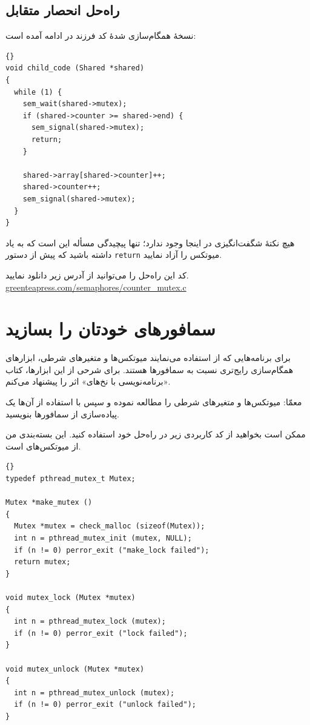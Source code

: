 \documentclass{book}
\newcommand{\clearemptydoublepage}{}%
\begin{document}

\clearemptydoublepage
\subsection{راه‌حل انحصار متقابل}

    نسخهٔ همگام‌سازی شدهٔ کد فرزند در ادامه آمده است:

\begin{latin}
\begin{lstlisting}[title={}]{}
void child_code (Shared *shared)
{
  while (1) {
    sem_wait(shared->mutex);
    if (shared->counter >= shared->end) {
      sem_signal(shared->mutex);
      return;
    }

    shared->array[shared->counter]++;
    shared->counter++;
    sem_signal(shared->mutex);
  }
}
\end{lstlisting}
\end{latin}

    هیچ نکتهٔ شگفت‌انگیزی در اینجا وجود ندارد؛ تنها پیچیدگی مسأله این است که به یاد داشته باشید که پیش از دستور {\tt return} میوتکس را آزاد نمایید.
    

    کد این راه‌حل را می‌توانید از آدرس زیر دانلود نمایید.
\url{greenteapress.com/semaphores/counter_mutex.c}


\clearemptydoublepage
\section{سمافورهای خودتان را بسازید}
\label{makeyourown}

    برای  برنامه‌هایی که از  استفاده می‌نمایند میوتکس‌ها و متغیرهای شرطی، ابزارهای همگام‌سازی رایج‌تری نسبت به سمافورها هستند. 
    برای شرحی از این ابزارها، کتاب «برنامه‌نویسی با نخ‌های» 
    اثر  را پیشنهاد می‌کنم. 

    معمّا: میوتکس‌ها و متغیرهای شرطی را مطالعه نموده و سپس با استفاده از آن‌ها یک پیاده‌سازی از سمافورها بنویسید. 

    ممکن است بخواهید از کد کاربردی زیر در راه‌حل خود استفاده کنید. 
    این بسته‌بندی من از میوتکس‌های  است.

\begin{latin}
\begin{lstlisting}[title={}]{}
typedef pthread_mutex_t Mutex;

Mutex *make_mutex ()
{
  Mutex *mutex = check_malloc (sizeof(Mutex));
  int n = pthread_mutex_init (mutex, NULL);
  if (n != 0) perror_exit ("make_lock failed"); 
  return mutex;
}

void mutex_lock (Mutex *mutex)
{
  int n = pthread_mutex_lock (mutex);
  if (n != 0) perror_exit ("lock failed");
}

void mutex_unlock (Mutex *mutex)
{
  int n = pthread_mutex_unlock (mutex);
  if (n != 0) perror_exit ("unlock failed");
}
\end{lstlisting}
\end{latin}
\end{document}
